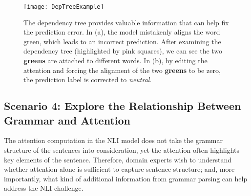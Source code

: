 
%
\begin{figure*}[t]
\centering
\vspace{-2mm}
 \texttt{[image: DepTreeExample]}
  \vspace{-3mm}
 \caption{
The dependency tree provides valuable information that can help fix the prediction error.
In (a), the model mistakenly aligns the word green, which leads to an incorrect prediction.
After examining the dependency tree (highlighted by pink squares), we can see the two \textbf{greens} are attached to different words.
In (b), by editing the attention and forcing the alignment of the two \textbf{greens} to be zero, the prediction label is corrected to \emph{neutral}.
 }
\label{fig:depTreeExample}
 \vspace{-4mm}
\end{figure*}

\subsection{Scenario 4: Explore the Relationship Between Grammar and Attention}
\label{sec:grammarAttention}
The attention computation in the NLI model does not take the grammar structure of the sentences into consideration,
yet the attention often highlights key elements of the sentence.
Therefore, domain experts wish to understand whether attention alone is sufficient to capture sentence structure;
and, more importantly, what kind of additional information from grammar parsing can help address the NLI challenge.

